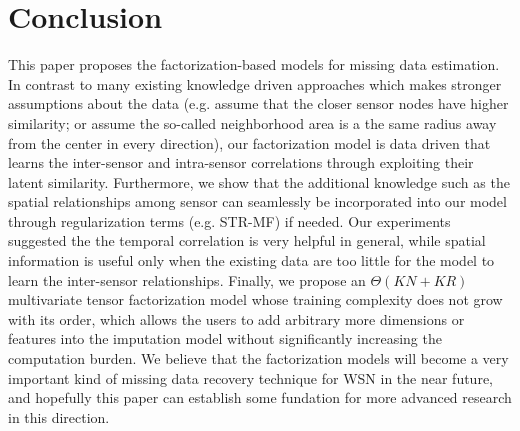 \section{Conclusion}  \label{sec:conc}
This paper proposes the factorization-based models for missing data estimation. In contrast to many existing knowledge driven approaches which makes stronger assumptions about the data (e.g. assume that the closer sensor nodes have higher similarity; or assume the so-called neighborhood area is a the same radius away from the center in every direction), our factorization model is data driven that learns the inter-sensor and intra-sensor correlations through exploiting their latent similarity. Furthermore, we show that the additional knowledge such as the spatial relationships among sensor can seamlessly be incorporated into our model through regularization terms (e.g. STR-MF) if needed. Our experiments suggested the the temporal correlation is very helpful in general, while spatial information is useful only when the existing data are too little for the model to learn the inter-sensor relationships. Finally, we propose an $\Theta(KN + KR)$ multivariate tensor factorization model whose training complexity does not grow with its order, which allows the users to add arbitrary more dimensions or features into the imputation model without significantly increasing the computation burden.
We believe that the factorization models will become a very important kind of missing data recovery technique for WSN in the near future, and hopefully this paper can establish some fundation for more advanced research in this direction. 
